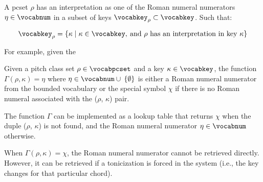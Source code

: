 
A \gls{pcset} $\rho$ has an interpretation as one of the
Roman numeral numerators $\eta \in \vocabnum$ in a subset of
keys $\vocabkey_{\rho} \subset \vocabkey$. Such that:

\begin{equation}
    \vocabkey_{\rho} = \{\kappa \mid \kappa \in \vocabkey,
     \: \text{and $\rho$ has an interpretation in key $\kappa$}\}
\end{equation}

For example, given the 

Given a pitch class set $\rho \in \vocabpcset$ and a key
$\kappa \in \vocabkey$, the function $\Gamma(\rho, \kappa) =
\eta$ where $\eta \in \vocabnum \cup \: \{ \emptyset \}$ is
either a Roman numeral numerator from the bounded vocabulary
or the special symbol $\chi$ if there is no Roman numeral
associated with the ($\rho$, $\kappa$) pair.

The function $\Gamma$ can be implemented as a lookup table
that returns $\chi$ when the duple ($\rho$, $\kappa$) is not
found, and the Roman numeral numerator $\eta \in \vocabnum$
otherwise.

When $\Gamma(\rho, \kappa) = \chi$, the Roman numeral
numerator cannot be retrieved directly. However, it can be
retrieved if a tonicization is forced in the system (i.e.,
the key changes for that particular chord).

